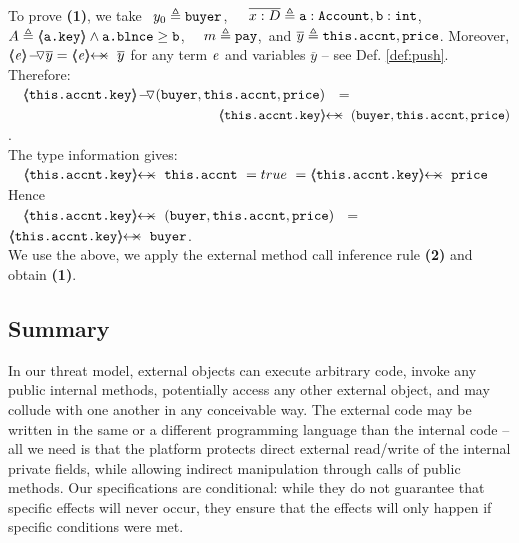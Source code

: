 \vspace{.05cm}
To prove  \textbf{(1)},  we take \  $y_0 \triangleq \mbox{\normalfont{\texttt{buyer}}}$,\ \ \  $\overline {x : D}\triangleq \mbox{\normalfont{\texttt{a}}}:\mbox{\normalfont{\texttt{Account}}},\mbox{\normalfont{\texttt{b}}}:\mbox{\normalfont{\texttt{int}}}$, 
\ \ $A \triangleq  \langle\!\!\langle \mbox{\normalfont{\texttt{a.key}}} \rangle\!\!\rangle\wedge \mbox{\normalfont{\texttt{a.\mbox{\normalfont{\texttt{blnce}}}}}}\geq \mbox{\normalfont{\texttt{b}}}$, \ \ 
$m \triangleq \mbox{\normalfont{\texttt{pay}}}$,\ and $\overline {y} \triangleq \mbox{\normalfont{\texttt{this.accnt}}},\mbox{\normalfont{\texttt{price}}}$. 
 Moreover, $\PushAS y {\inside \re} = \protectedFrom \re {\overline{y}}$ for any term $\mathit{e}$ and variables $\overline y$ 
-- see  Def. \ref{def:push}.
Therefore:\\
   {\small{$\strut \ \ \ \PushASLong {(\prg{buyer},\prg{this.\myAccount},\prg{price})}  {\inside {\prg{this.\myAccount.key}}}$}} \ = \\
 {\small{$\strut \ \hspace{5.5cm}  \protectedFrom {\prg{this.\myAccount.key}} {(\prg{buyer},\prg{this.\myAccount},\prg{price})}$}}.\\
 The type information gives:\\
  {\small{$\strut \ \ \ \protectedFrom {\prg{this.\myAccount.key}} {\prg{this.\myAccount}}\ = true \ =  \protectedFrom {\prg{this.\myAccount.key}} {\prg{price}}$}}\\
  Hence\\
  {\small{$\strut \ \ \ \protectedFrom {\prg{this.\myAccount.key}} {(\prg{buyer},\prg{this.\myAccount},\prg{price})}$ 
 \ = \  $\protectedFrom {\prg{this.\myAccount.key}} {\prg{buyer}}$.}} \\
We use the above, we apply the external method call inference rule \textbf{(2)}  and obtain \textbf{(1)}.
 

 
\subsection*{Summary}

In our threat model, external objects can execute arbitrary code, invoke any public internal methods,  potentially access any other external object, and may collude with one another in any conceivable way.
The external code may be written in the same or a different programming language than the internal code -- all we need is that the platform protects direct external read/write of  the internal private fields, while allowing indirect manipulation through calls of public methods.
Our specifications are conditional: while they do not guarantee that specific effects will never occur, they  ensure that the effects will only happen if specific conditions were met. %




